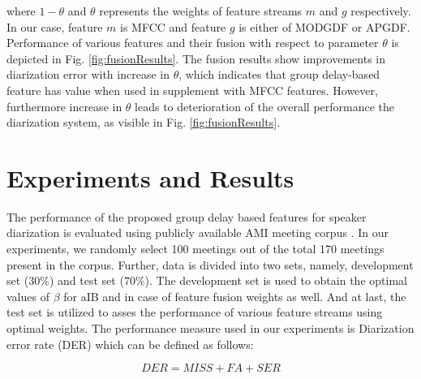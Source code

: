 \documentclass[conference]{IEEEtran}
\begin{document}
where $1-\theta$ and $\theta$ represents the weights of feature streams $m$ and $g$ respectively. In our case, feature $m$ is MFCC and feature 
$g$ is either of MODGDF or APGDF. Performance of various features and their fusion 
with respect to parameter $\theta$ is depicted in Fig. \ref{fig:fusionResults}. The fusion results 
show improvements in diarization error with increase in $\theta$, which indicates that group delay-based 
feature has value when used in supplement with MFCC features. However, furthermore increase in $\theta$ leads to deterioration of the overall performance the diarization system, as visible in Fig. \ref{fig:fusionResults}.   



\section{Experiments and Results }
\label{experimentsNresults}

The performance of the proposed group delay based features for
speaker diarization is evaluated using publicly available AMI meeting corpus \cite{AMIData}. In
our experiments, we randomly select 100 meetings out of the total 170 meetings present in
the corpus. Further, data is divided into two sets, namely, development set ($30\%$) and test set ($70\%$).
The development set is used to obtain the optimal values of $\beta$ for aIB and in case of
feature fusion weights as well. And at last, the test set is utilized to asses the performance of various feature streams using optimal weights. The performance measure used in our experiments is Diarization error rate (DER) which can be defined as follows: 

\begin{equation}
DER = MISS + FA + SER
\end{equation}

\end{document}
